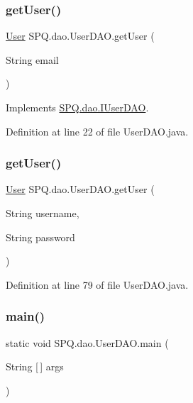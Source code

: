 \subsubsection{\texorpdfstring{get\+User()}{getUser()}\hspace{0.1cm}{\footnotesize\ttfamily [2/3]}}
{\footnotesize\ttfamily \mbox{\hyperlink{class_s_p_q_1_1data_1_1_user}{User}} S\+P\+Q.\+dao.\+User\+D\+A\+O.\+get\+User (\begin{DoxyParamCaption}\item[{String}]{email }\end{DoxyParamCaption})}



Implements \mbox{\hyperlink{interface_s_p_q_1_1dao_1_1_i_user_d_a_o_ac53b137d5e0828058457e59fa70c2b95}{S\+P\+Q.\+dao.\+I\+User\+D\+AO}}.



Definition at line 22 of file User\+D\+A\+O.\+java.

\mbox{\label{class_s_p_q_1_1dao_1_1_user_d_a_o_a2fe3e16e787f453b37f061de24cc49eb}} 
\subsubsection{\texorpdfstring{get\+User()}{getUser()}\hspace{0.1cm}{\footnotesize\ttfamily [3/3]}}
{\footnotesize\ttfamily \mbox{\hyperlink{class_s_p_q_1_1data_1_1_user}{User}} S\+P\+Q.\+dao.\+User\+D\+A\+O.\+get\+User (\begin{DoxyParamCaption}\item[{String}]{username,  }\item[{String}]{password }\end{DoxyParamCaption})}



Definition at line 79 of file User\+D\+A\+O.\+java.

\mbox{\label{class_s_p_q_1_1dao_1_1_user_d_a_o_a8f6efdd35a56fedb08c9c9c62586c36b}} 
\subsubsection{\texorpdfstring{main()}{main()}}
{\footnotesize\ttfamily static void S\+P\+Q.\+dao.\+User\+D\+A\+O.\+main (\begin{DoxyParamCaption}\item[{String \mbox{[}$\,$\mbox{]}}]{args }\end{DoxyParamCaption})\hspace{0.3cm}{\ttfamily [static]}}



